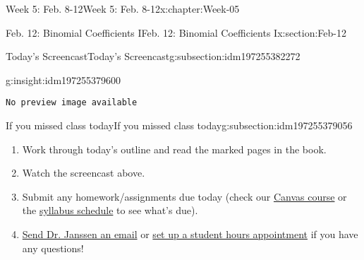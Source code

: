 \documentclass[oneside,10pt,]{book}
\newcommand{\mono}[1]{\texttt{#1}}
\numberwithin{equation}{section}
\newlength{\qrsize}
\newlength{\previewwidth}
\begin{document}
\begin{chapterptx}{Week 5: Feb. 8-12}{}{Week 5: Feb. 8-12}{}{}{x:chapter:Week-05}
\begin{sectionptx}{Feb. 12: Binomial Coefficients I}{}{Feb. 12: Binomial Coefficients I}{}{}{x:section:Feb-12}
\begin{subsectionptx}{Today's Screencast}{}{Today's Screencast}{}{}{g:subsection:idm197255382272}
\begin{insight}{}{g:insight:idm197255379600}
\setlength{\qrsize}{9em}
\setlength{\previewwidth}{\linewidth}
\addtolength{\previewwidth}{-\qrsize}
\begin{tcbraster}[raster columns=2, raster column skip=1pt, raster halign=center, raster force size=false, raster left skip=0pt, raster right skip=0pt]%
\begin{tcolorbox}[previewstyle, width=\previewwidth]%
\mono{No preview image available}%
\end{tcolorbox}%
\begin{tcolorbox}[qrstyle]%
[QR LINK]\end{tcolorbox}%
\end{tcbraster}%
\end{insight}
\end{subsectionptx}
%
%
\typeout{************************************************}
\typeout{************************************************}
%
\begin{subsectionptx}{If you missed class today}{}{If you missed class today}{}{}{g:subsection:idm197255379056}
%
\begin{enumerate}
\item{}Work through today's outline and read the marked pages in the book.%
\item{}Watch the screencast above.%
\item{}Submit any homework\slash{}assignments due today (check our \href{https://dordt.instructure.com/courses/3110050}{Canvas course} or the \href{https://prof.mkjanssen.org/ds/index.html\#schedule}{syllabus schedule} to see what's due).%
\item{}\href{mailto:mike.janssen@dordt.edu}{Send Dr. Janssen an email} or \href{https://calendly.com/mkjanssen/student-hours}{set up a student hours appointment} if you have any questions!%
\end{enumerate}
\end{subsectionptx}
\end{sectionptx}
\end{chapterptx}
%
%
\typeout{************************************************}
\typeout{************************************************}
%
\end{document}
